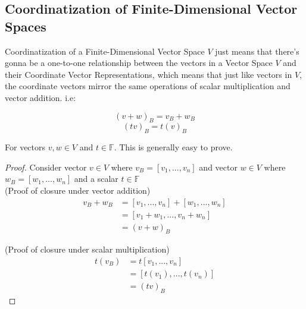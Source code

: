 \documentclass[12pt]{article}
\begin{document}
\subsection{Coordinatization of Finite-Dimensional Vector Spaces}

Coordinatization of a Finite-Dimensional Vector Space $V$ just means that there's gonna be a one-to-one relationship between the vectors in a Vector Space $V$ and their Coordinate Vector Representations, which means that just like vectors in $V$, the coordinate vectors mirror the same operations of scalar multiplication and vector addition. i.e:

$$(v + w)_B = v_B + w_B$$
$$(tv)_B = t(v)_B$$

For vectors $v,w \in V$ and $t \in \mathbb{F}$. This is generally easy to prove.

\begin{proof} Consider vector $v \in V$ where $v_B = [v_1, ... ,v_n]$ and vector $w \in V$ where $w_B = [w_1, ... ,w_n]$ and a scalar $t \in \mathbb{F}$\\
(Proof of closure under vector addition)
\begin{align*}
	v_B + w_B &= [v_1, ... ,v_n] + [w_1, ... ,w_n]\\
	&= [v_1 + w_1, ... ,v_n + w_n]\\
	&= (v + w)_B
\end{align*}

(Proof of closure under scalar multiplication)
\begin{align*}
	t(v_B) &= t[v_1, ... ,v_n]\\
	&= [t(v_1), ... ,t(v_n)]\\
	&= (tv)_B
\end{align*}

\end{proof}
\end{document}
